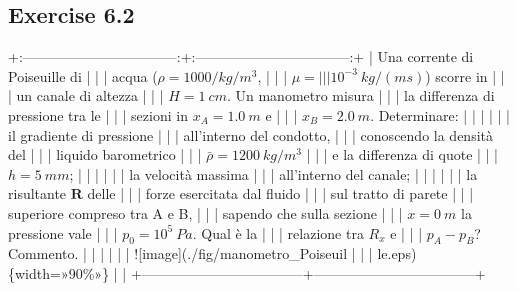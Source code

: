 \documentclass[letterpaper,10pt,italian]{jupyterBook}
\begin{document}
\subsection{Exercise 6.2}
\label{\detokenize{polimi/fluidmechanics-ita/template/capitoli/06_slnEsatte/0607in:exercise-6-2}}\label{\detokenize{polimi/fluidmechanics-ita/template/capitoli/06_slnEsatte/0607in:fluid-mechanics-exact-solutions-ex02}}\label{\detokenize{polimi/fluidmechanics-ita/template/capitoli/06_slnEsatte/0607in::doc}}
\sphinxAtStartPar
+:———————————:+:———————————:+
| Una corrente di Poiseuille di     |                                   |
| acqua (\(\rho = 1000 / kg/m^3\),    |                                   |
| \(\mu =                            |                                   |
|  10^{-3} \ kg/(m s)\)) scorre in   |                                   |
| un canale di altezza              |                                   |
| \(H = 1 \ cm\). Un manometro misura |                                   |
| la differenza di pressione tra le |                                   |
| sezioni in \(x_A = 1.0 \ m\) e      |                                   |
| \(x_B= 2.0 \ m\). Determinare:      |                                   |
|                                   |                                   |
| \sphinxhyphen{}   il gradiente di pressione     |                                   |
|     all’interno del condotto,     |                                   |
|     conoscendo la densità del     |                                   |
|     liquido barometrico           |                                   |
|     \(\bar{\rho} = 1200 \ kg/m^3\)  |                                   |
|     e la differenza di quote      |                                   |
|     \(h = 5 \ mm\);                 |                                   |
|                                   |                                   |
| \sphinxhyphen{}   la velocità massima           |                                   |
|     all’interno del canale;       |                                   |
|                                   |                                   |
| \sphinxhyphen{}   la risultante \(\bm{R}\) delle  |                                   |
|     forze esercitata dal fluido   |                                   |
|     sul tratto di parete          |                                   |
|     superiore compreso tra A e B, |                                   |
|     sapendo che sulla sezione     |                                   |
|     \(x = 0 \ m\) la pressione vale |                                   |
|     \(p_0 = 10^5 \ Pa\). Qual è la  |                                   |
|     relazione tra \(R_x\) e         |                                   |
|     \(p_A - p_B\)? Commento.        |                                   |
|                                   |                                   |
| !{[}image{]}(./fig/manometro\_Poiseuil |                                   |
| le.eps)\{width=»90\%»\}              |                                   |
+———————————–+———————————–+
\end{document}
